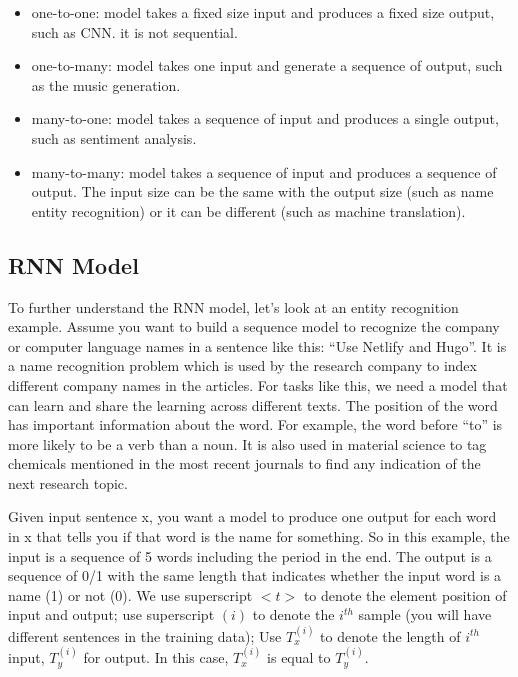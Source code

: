 \documentclass[12pt,]{krantz}
\providecommand{\tightlist}{%
  \setlength{\itemsep}{0pt}\setlength{\parskip}{0pt}}
\begin{document}
\begin{itemize}
\tightlist
\item
  one-to-one: model takes a fixed size input and produces a fixed size output, such as CNN. it is not sequential.
\item
  one-to-many: model takes one input and generate a sequence of output, such as the music generation.
\item
  many-to-one: model takes a sequence of input and produces a single output, such as sentiment analysis.
\item
  many-to-many: model takes a sequence of input and produces a sequence of output. The input size can be the same with the output size (such as name entity recognition) or it can be different (such as machine translation).
\end{itemize}

\hypertarget{rnn-model}{%
\subsection{RNN Model}\label{rnn-model}}

To further understand the RNN model, let's look at an entity recognition example. Assume you want to build a sequence model to recognize the company or computer language names in a sentence like this: ``Use Netlify and Hugo''. It is a name recognition problem which is used by the research company to index different company names in the articles. For tasks like this, we need a model that can learn and share the learning across different texts. The position of the word has important information about the word. For example, the word before ``to'' is more likely to be a verb than a noun. It is also used in material science to tag chemicals mentioned in the most recent journals to find any indication of the next research topic.

Given input sentence x, you want a model to produce one output for each word in x that tells you if that word is the name for something. So in this example, the input is a sequence of 5 words including the period in the end. The output is a sequence of 0/1 with the same length that indicates whether the input word is a name (1) or not (0). We use superscript \(<t>\) to denote the element position of input and output; use superscript \((i)\) to denote the \(i^{th}\) sample (you will have different sentences in the training data); Use \(T_x^{(i)}\) to denote the length of \(i^{th}\) input, \(T_y^{(i)}\) for output. In this case, \(T_x^{(i)}\) is equal to \(T_y^{(i)}\).
\end{document}
